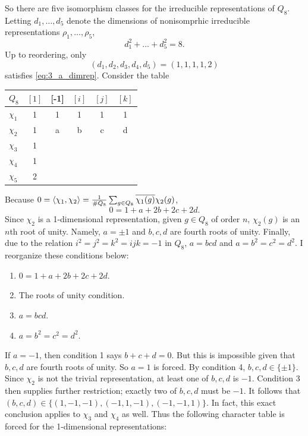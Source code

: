 \documentclass[12pt]{article}
\begin{document}
So there are five isomorphism classes for the irreducible representations of $Q_8$. 
Letting $d_1, \ldots, d_5$ denote the dimensions of nonisomprhic irreducible representations $\rho_1, \ldots, \rho_5$, 
\begin{equation} \label{eq:3_a_dimrep}
d_{1}^2 + \ldots + d_{5}^{2} = 8.
\end{equation}
Up to reordering, only 
$$(d_1, d_2, d_3, d_4, d_5) = (1, 1, 1, 1, 2)$$ 
satisfies \eqref{eq:3_a_dimrep}. 
Consider the table
\begin{center}
  \begin{tabular}{l | ccccc}
    $Q_8$ & $[1]$ & [-1] & $[i]$ & $[j]$ & $[k]$ \\
    \midrule
    $\chi_1$ & 1 & 1  & 1 & 1 & 1 \\
    $\chi_2$ & 1 & a & b & c & d \\
    $\chi_3$ & 1 &  &  & & \\ 
    $\chi_4$ & 1 &  &  &  & \\
    $\chi_5$ & 2 &  &  &  &
  \end{tabular}
\end{center}
Because $0 = \langle\chi_1, \chi_2\rangle = \frac{1}{\#Q_8}\sum_{g \in Q_8} \overline{\chi_{1}(g)}\chi_{2}(g)$,
$$0 = 1 + a + 2b + 2c + 2d.$$
Since $\chi_2$ is a 1-dimensional representation, given $g \in Q_8$ of order $n$, $\chi_{2}(g)$ is an $n$th root of unity. 
Namely, $a = \pm 1$ and $b, c, d$ are fourth roots of unity. 
Finally, due to the relation $i^2 = j^2 = k^2 = ijk = -1$ in $Q_8$, $a = bcd$ and $a = b^2 = c^2 = d^2$. 
I reorganize these conditions below: 
\begin{enumerate}
  \item $0 = 1 + a + 2b + 2c + 2d.$
  \item The roots of unity condition.
  \item $a = bcd$.
  \item $a = b^2 = c^2 = d^2$. 
\end{enumerate}
If $a = -1$, then condition 1 says $b + c + d = 0$. 
But this is impossible given that $b, c, d$ are fourth roots of unity. 
So $a = 1$ is forced. 
By condition 4, $b, c, d \in \{\pm 1\}$. 
Since $\chi_2$ is not the trivial representation, at least one of $b, c, d$ is $-1$. 
Condition 3 then supplies further restriction; 
exactly two of $b, c, d$ must be $-1$. 
It follows that $(b, c, d) \in \{(1, -1, -1), (-1, 1, -1), (-1, -1, 1)\}$. 
In fact, this exact conclusion applies to $\chi_3$ and $\chi_4$ as well. 
Thus the following character table is forced for the 1-dimensional representations: 
\end{document}

